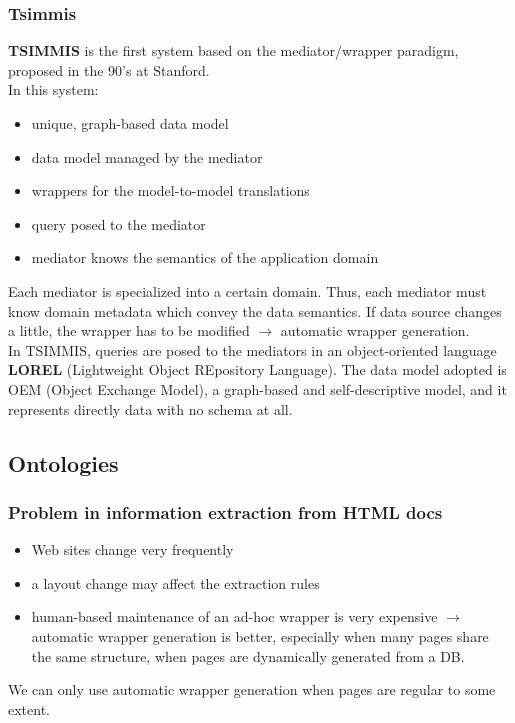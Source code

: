 \documentclass[10pt,a4paper]{article}
\begin{document}
\subsubsection{Tsimmis}
\textbf{TSIMMIS} is the first system based on the mediator/wrapper paradigm, proposed in the 90’s at Stanford. \\ 
In this system:
\begin{itemize}
	\item unique, graph-based data model
	\item data model managed by the mediator
	\item wrappers for the model-to-model translations
	\item query posed to the mediator
	\item mediator knows the semantics of the application domain
\end{itemize}
Each mediator is specialized into a certain domain. Thus, each mediator must know domain metadata which convey the data semantics. If data source changes a little, the wrapper has to be modified $\rightarrow$ automatic wrapper generation. \\
In TSIMMIS, queries are posed to the mediators in an object-oriented language \textbf{LOREL} (Lightweight Object REpository Language). The data model adopted is OEM (Object Exchange Model), a graph-based and self-descriptive model, and it represents directly data with no schema at all.
\subsection{Ontologies}
\subsubsection{Problem in information extraction from HTML docs}
\begin{itemize}
	\item Web sites change very frequently
	\item a layout change may affect the extraction rules
	\item human-based maintenance of an ad-hoc wrapper is very expensive
$\rightarrow$ automatic wrapper generation is better, especially when many pages share the same structure, when pages are dynamically generated from a DB.
\end{itemize}
We can only use automatic wrapper generation when pages are regular to some extent.
\end{document}
